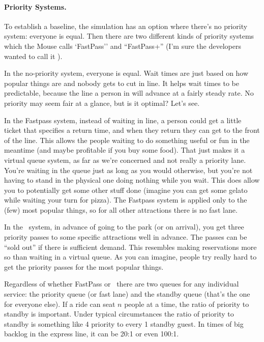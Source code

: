 \documentclass[a4paper]{report}
\begin{document}
\paragraph{Priority Systems.}
To establish a baseline, the simulation has an option where there's no priority system: everyone is equal. Then there are two different kinds of priority systems which the Mouse calls `FastPass'' and ``FastPass+'' (I'm sure the developers wanted to call it \FPP).

In the no-priority system, everyone is equal. Wait times are just based on how popular things are and nobody gets to cut in line. It helps wait times to be predictable, because the line a person in will advance at a fairly steady rate. No priority may seem fair at a glance, but is it optimal? Let's see. 

In the Fastpass system, instead of waiting in line, a person could get a little ticket that specifies a return time, and when they return they can get to the front of the line. This allows the people waiting to do something useful or fun in the meantime (and maybe profitable if you buy some food). That just makes it a virtual queue system, as far as we're concerned and not really a priority lane. You're waiting in the queue just as long as you would otherwise, but you're not having to stand in the physical one doing nothing while you wait. This does allow you to potentially get some other stuff done (imagine you can get some gelato while waiting your turn for pizza). The Fastpass system is applied only to the (few) most popular things, so for all other attractions there is no fast lane. 

In the \FPP~system, in advance of going to the park (or on arrival), you get three priority passes to some specific attractions well in advance. The passes can be ``sold out'' if there is sufficient demand. This resembles making reservations more so than waiting in a virtual queue. As you can imagine, people try really hard to get the priority passes for the most popular things.

Regardless of whether FastPass or \FPP~there are two queues for any individual service: the priority queue (or fast lane) and the standby queue (that's the one for everyone else). If a ride can seat $n$ people at a time, the ratio of priority to standby is important. Under typical circumstances the ratio of priority to standby is something like 4 priority to every 1 standby guest. In times of big backlog in the express line, it can be 20:1 or even 100:1.
\end{document}
